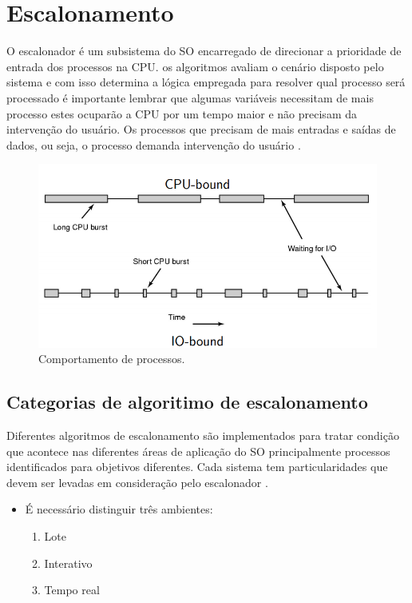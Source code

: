 \newpage
\section{Escalonamento}\label{sec:Escalonamento}

O escalonador é um subsistema do SO encarregado de direcionar a prioridade de entrada dos processos na CPU. os algoritmos avaliam o cenário disposto pelo sistema e com isso determina a lógica empregada para resolver qual processo será processado é importante lembrar que algumas variáveis necessitam de mais processo estes ocuparão a CPU por um tempo maior e não precisam da intervenção do usuário. Os processos que precisam de mais entradas e saídas de dados, ou seja, o processo demanda intervenção do usuário \cite{Tanenbaum2016}.
\begin{figure}[htpb]
    \centering
   \includegraphics[scale=.4]{imagens/escalonamento1.png}
   \caption{Comportamento de processos. \cite{Tanenbaum2016}}
   \label{fig:escalonador}
\end{figure}

\subsection{Categorias de algoritimo de escalonamento}

Diferentes algoritmos de escalonamento são implementados para tratar condição que acontece nas diferentes áreas de aplicação do SO principalmente processos identificados para objetivos diferentes. Cada sistema tem particularidades que devem ser levadas em consideração pelo escalonador \cite{Tanenbaum2016}.

\begin{itemize}[label=$-$]
	\item É necessário distinguir três ambientes:
    \begin{enumerate}
        \item Lote
        \item Interativo
        \item Tempo real 
    \end{enumerate}
\end{itemize}

